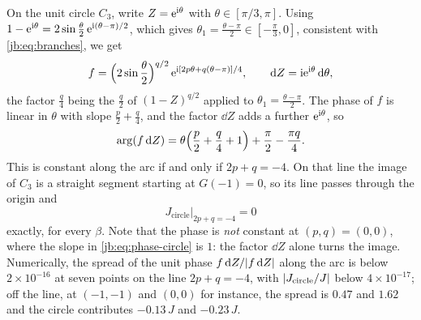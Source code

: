 On the unit circle $C_3$, write $Z = \mathrm{e}^{\mathrm{i} \theta}$ with $\theta \in [\pi/3, \pi]$.
Using $1 - \mathrm{e}^{\mathrm{i} \theta} = 2 \sin \tfrac{\theta}{2} \, \mathrm{e}^{\mathrm{i} (\theta - \pi)/2}$, which gives
$\theta_1 = \tfrac{\theta - \pi}{2} \in [-\tfrac{\pi}{3}, 0]$, consistent with
\eqref{jb:eq:branches}, we get
\begin{equation}
  \label{jb:eq:f-circle}
  f
    = \Bigl( 2 \sin \frac{\theta}{2} \Bigr)^{q/2} \,
      \mathrm{e}^{\mathrm{i} [ 2 p \theta + q (\theta - \pi) ] / 4},
  \qquad
  \mathrm{d} Z
    = \mathrm{i} \mathrm{e}^{\mathrm{i} \theta} \, \mathrm{d} \theta ,
\end{equation}
the factor $\tfrac{q}{4}$ being the $\tfrac{q}{2}$ of $(1 - Z)^{q/2}$ applied to
$\theta_1 = \tfrac{\theta - \pi}{2}$.
The phase of $f$ is linear in $\theta$ with slope $\tfrac{p}{2} + \tfrac{q}{4}$, and the factor
$\dd Z$ adds a further $\mathrm{e}^{\mathrm{i} \theta}$, so
\begin{equation}
  \label{jb:eq:phase-circle}
  \arg (f \, \mathrm{d} Z)
    = \theta \Bigl( \frac{p}{2} + \frac{q}{4} + 1 \Bigr)
      + \frac{\pi}{2}
      - \frac{\pi q}{4} .
\end{equation}
This is constant along the arc if and only if $2 p + q = -4$.
On that line the image of $C_3$ is a straight segment starting at $G(-1) = 0$, so its line passes
through the origin and
\begin{equation}
  \label{jb:eq:J-circle-line}
  J_{\text{circle}} \big|_{2 p + q = -4}
    = 0
\end{equation}
exactly, for every $\beta$.
Note that the phase is \emph{not} constant at $(p, q) = (0, 0)$, where the slope in
\eqref{jb:eq:phase-circle} is $1$: the factor $\dd Z$ alone turns the image.
Numerically, the spread of the unit phase $f \, \mathrm{d} Z / {|f \, \mathrm{d} Z|}$ along the arc is below
$2 \times 10^{-16}$ at seven points on the line $2 p + q = -4$, with ${|J_{\text{circle}} / J|}$
below $4 \times 10^{-17}$; off the line, at $(-1, -1)$ and $(0, 0)$ for instance, the spread is
$0.47$ and $1.62$ and the circle contributes $-0.13 \, J$ and $-0.23 \, J$.

